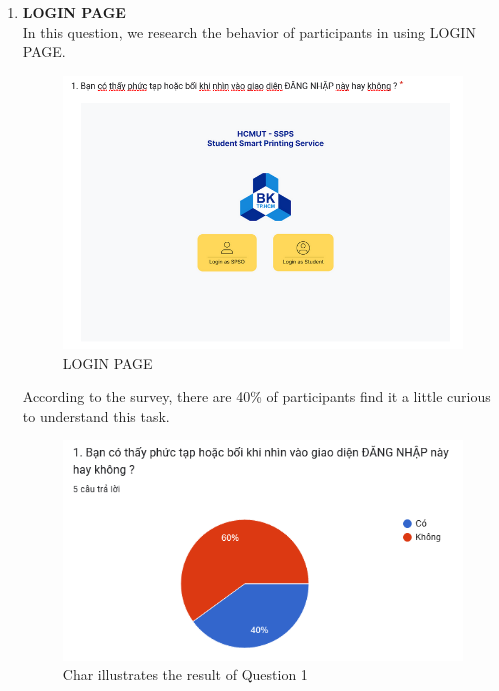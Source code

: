 \begin{enumerate}
    \item \textbf{LOGIN PAGE} \\
    In this question, we research the behavior of participants in using LOGIN PAGE.
\begin{figure}[!h]
    \centering
    \includegraphics[width=0.8\linewidth]{images/image_uasbility/Q1_Stu.png}
    \caption{LOGIN PAGE}
    \label{fig:LOGIN PAGE}
\end{figure}
\newpage
According to the survey, there are 40\% of participants find it a little curious to understand this task.
\begin{figure}[!h]
    \centering
    \includegraphics[width=0.8\linewidth]{images/image_uasbility/A1_Stu.png}
    \caption{Char illustrates the result of Question 1}
    \label{fig:Chat illustrates the results of Question 1}
\end{figure}


\end{enumerate}
